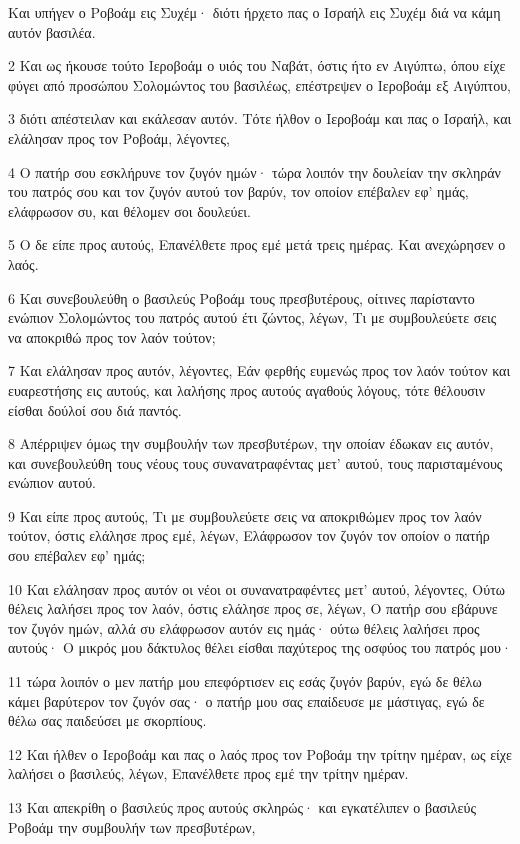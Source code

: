 \par Και υπήγεν ο Ροβοάμ εις Συχέμ· διότι ήρχετο πας ο Ισραήλ εις Συχέμ διά να κάμη αυτόν βασιλέα.
\par 2 Και ως ήκουσε τούτο Ιεροβοάμ ο υιός του Ναβάτ, όστις ήτο εν Αιγύπτω, όπου είχε φύγει από προσώπου Σολομώντος του βασιλέως, επέστρεψεν ο Ιεροβοάμ εξ Αιγύπτου,
\par 3 διότι απέστειλαν και εκάλεσαν αυτόν. Τότε ήλθον ο Ιεροβοάμ και πας ο Ισραήλ, και ελάλησαν προς τον Ροβοάμ, λέγοντες,
\par 4 Ο πατήρ σου εσκλήρυνε τον ζυγόν ημών· τώρα λοιπόν την δουλείαν την σκληράν του πατρός σου και τον ζυγόν αυτού τον βαρύν, τον οποίον επέβαλεν εφ' ημάς, ελάφρωσον συ, και θέλομεν σοι δουλεύει.
\par 5 Ο δε είπε προς αυτούς, Επανέλθετε προς εμέ μετά τρεις ημέρας. Και ανεχώρησεν ο λαός.
\par 6 Και συνεβουλεύθη ο βασιλεύς Ροβοάμ τους πρεσβυτέρους, οίτινες παρίσταντο ενώπιον Σολομώντος του πατρός αυτού έτι ζώντος, λέγων, Τι με συμβουλεύετε σεις να αποκριθώ προς τον λαόν τούτον;
\par 7 Και ελάλησαν προς αυτόν, λέγοντες, Εάν φερθής ευμενώς προς τον λαόν τούτον και ευαρεστήσης εις αυτούς, και λαλήσης προς αυτούς αγαθούς λόγους, τότε θέλουσιν είσθαι δούλοί σου διά παντός.
\par 8 Απέρριψεν όμως την συμβουλήν των πρεσβυτέρων, την οποίαν έδωκαν εις αυτόν, και συνεβουλεύθη τους νέους τους συνανατραφέντας μετ' αυτού, τους παρισταμένους ενώπιον αυτού.
\par 9 Και είπε προς αυτούς, Τι με συμβουλεύετε σεις να αποκριθώμεν προς τον λαόν τούτον, όστις ελάλησε προς εμέ, λέγων, Ελάφρωσον τον ζυγόν τον οποίον ο πατήρ σου επέβαλεν εφ' ημάς;
\par 10 Και ελάλησαν προς αυτόν οι νέοι οι συνανατραφέντες μετ' αυτού, λέγοντες, Ούτω θέλεις λαλήσει προς τον λαόν, όστις ελάλησε προς σε, λέγων, Ο πατήρ σου εβάρυνε τον ζυγόν ημών, αλλά συ ελάφρωσον αυτόν εις ημάς· ούτω θέλεις λαλήσει προς αυτούς· Ο μικρός μου δάκτυλος θέλει είσθαι παχύτερος της οσφύος του πατρός μου·
\par 11 τώρα λοιπόν ο μεν πατήρ μου επεφόρτισεν εις εσάς ζυγόν βαρύν, εγώ δε θέλω κάμει βαρύτερον τον ζυγόν σας· ο πατήρ μου σας επαίδευσε με μάστιγας, εγώ δε θέλω σας παιδεύσει με σκορπίους.
\par 12 Και ήλθεν ο Ιεροβοάμ και πας ο λαός προς τον Ροβοάμ την τρίτην ημέραν, ως είχε λαλήσει ο βασιλεύς, λέγων, Επανέλθετε προς εμέ την τρίτην ημέραν.
\par 13 Και απεκρίθη ο βασιλεύς προς αυτούς σκληρώς· και εγκατέλιπεν ο βασιλεύς Ροβοάμ την συμβουλήν των πρεσβυτέρων,
